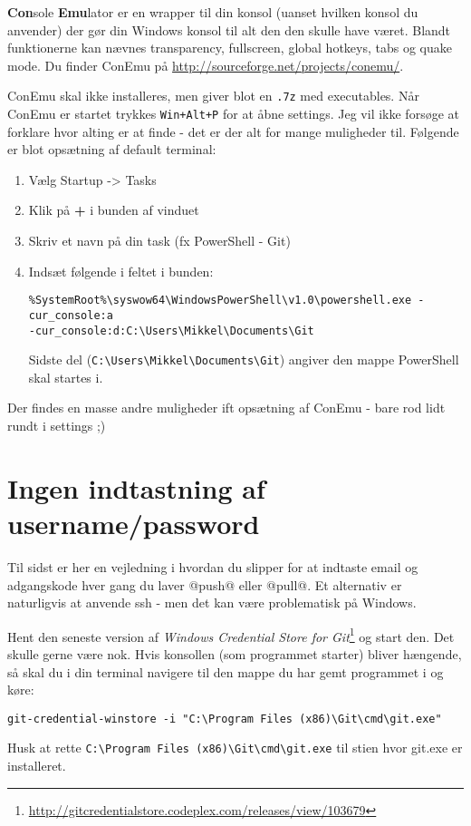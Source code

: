 \textbf{Con}sole \textbf{Emu}lator er en wrapper til din konsol (uanset hvilken konsol du anvender) der gør din Windows konsol til alt den den skulle have været.
Blandt funktionerne kan nævnes transparency, fullscreen, global hotkeys, tabs og quake mode.
Du finder ConEmu på \url{http://sourceforge.net/projects/conemu/}.

ConEmu skal ikke installeres, men giver blot en \texttt{.7z} med executables.
Når ConEmu er startet trykkes \texttt{Win+Alt+P} for at åbne settings.
Jeg vil ikke forsøge at forklare hvor alting er at finde - det er der alt for mange muligheder til.
Følgende er blot opsætning af default terminal:
\begin{enumerate}
\item Vælg Startup -> Tasks
\item Klik på \textbf{+} i bunden af vinduet
\item Skriv et navn på din task (fx PowerShell - Git)
\item Indsæt følgende i feltet i bunden:
\begin{lstlisting}
%SystemRoot%\syswow64\WindowsPowerShell\v1.0\powershell.exe -cur_console:a
-cur_console:d:C:\Users\Mikkel\Documents\Git
\end{lstlisting}
Sidste del (\lstinline!C:\Users\Mikkel\Documents\Git!) angiver den mappe PowerShell skal startes i.
\end{enumerate}

Der findes en masse andre muligheder ift opsætning af ConEmu - bare rod lidt rundt i settings ;)

\section{Ingen indtastning af username/password}
Til sidst er her en vejledning i hvordan du slipper for at indtaste email og adgangskode hver gang du laver @push@ eller @pull@.
Et alternativ er naturligvis at anvende ssh - men det kan være problematisk på Windows.

Hent den seneste version af \textit{Windows Credential Store for Git}\footnote{\url{http://gitcredentialstore.codeplex.com/releases/view/103679}} og start den.
Det skulle gerne være nok.
Hvis konsollen (som programmet starter) bliver hængende, så skal du i din terminal navigere til den mappe du har gemt programmet i og køre:
\begin{lstlisting}
git-credential-winstore -i "C:\Program Files (x86)\Git\cmd\git.exe"
\end{lstlisting}
Husk at rette \lstinline!C:\Program Files (x86)\Git\cmd\git.exe! til stien hvor git.exe er installeret.